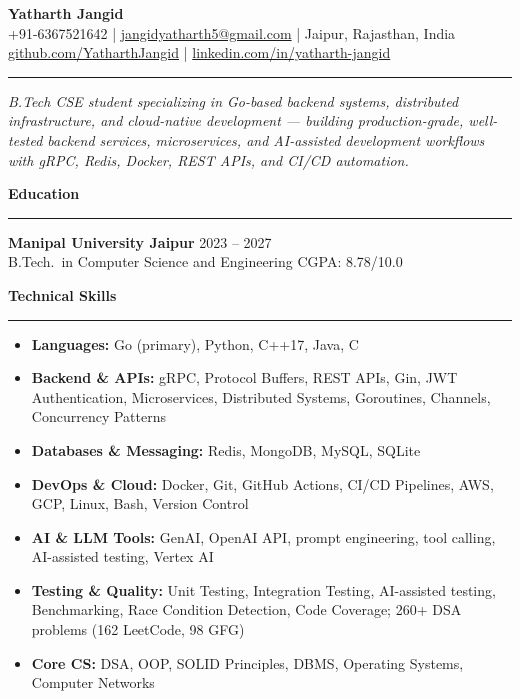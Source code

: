 \documentclass[10pt,a4paper]{article}
\newcommand{\ressection}[1]{%
  \vspace{3pt}%
  {\bfseries\normalsize #1}%
  \vspace{1pt}\hrule\vspace{2pt}%
}
\begin{document}
\begin{center}
{\Large \textbf{Yatharth Jangid}} \\[2pt]
+91-6367521642 \;|\;
\href{mailto:jangidyatharth5@gmail.com}{jangidyatharth5@gmail.com} \;|\;
Jaipur, Rajasthan, India \\[1pt]
\href{https://github.com/YatharthJangid}{github.com/YatharthJangid} \;|\;
\href{https://linkedin.com/in/yatharth-jangid}{linkedin.com/in/yatharth-jangid}
\end{center}

\vspace{1pt}\hrule\vspace{2pt}
\begin{center}
\small\textit{B.Tech CSE student specializing in Go-based backend systems, distributed infrastructure,
and cloud-native development --- building production-grade, well-tested backend services,
microservices, and AI-assisted development workflows with gRPC, Redis, Docker, REST APIs,
and CI/CD automation.}
\end{center}
\vspace{2pt}

\ressection{Education}
\textbf{Manipal University Jaipur} \hfill 2023 -- 2027 \\
B.Tech.\ in Computer Science and Engineering \hfill CGPA: 8.78/10.0

\ressection{Technical Skills}
\begin{itemize}
  \item \textbf{Languages:} Go (primary), Python, C++17, Java, C
  \item \textbf{Backend \& APIs:} gRPC, Protocol Buffers, REST APIs, Gin, JWT Authentication,
        Microservices, Distributed Systems, Goroutines, Channels, Concurrency Patterns
  \item \textbf{Databases \& Messaging:} Redis, MongoDB, MySQL, SQLite
  \item \textbf{DevOps \& Cloud:} Docker, Git, GitHub Actions, CI/CD Pipelines, AWS, GCP, Linux, Bash, Version Control
  \item \textbf{AI \& LLM Tools:} GenAI, OpenAI API, prompt engineering, tool calling, AI-assisted testing, Vertex AI
  \item \textbf{Testing \& Quality:} Unit Testing, Integration Testing, AI-assisted testing, Benchmarking,
        Race Condition Detection, Code Coverage; 260+ DSA problems (162 LeetCode, 98 GFG)
  \item \textbf{Core CS:} DSA, OOP, SOLID Principles, DBMS, Operating Systems, Computer Networks
\end{itemize}
\end{document}
